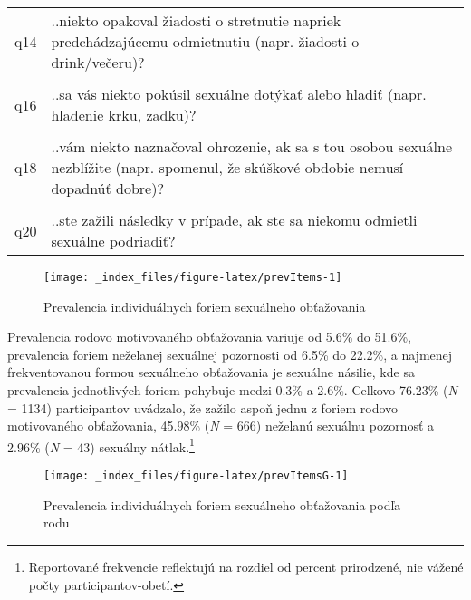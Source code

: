 \documentclass[
]{article}
\begin{document}
\begin{table}[H]
{\begin{tabular}[t]{ll}
q14 & ..niekto opakoval žiadosti o stretnutie napriek predchádzajúcemu odmietnutiu (napr. žiadosti o drink/večeru)?\\
\cellcolor{gray!6}{q15} & \cellcolor{gray!6}{..sa vás niekto dotýkal spôsobom, ktorý vo vás vyvolával nepríjemné pocity (napr. dal vám ruku cez plece, potľapkal vás po ramene, zadku)?}\\
\addlinespace
q16 & ..sa vás niekto pokúsil sexuálne dotýkať alebo hladiť (napr. hladenie krku, zadku)?\\
\cellcolor{gray!6}{q17} & \cellcolor{gray!6}{..vám niekto naznačoval výhody za sexuálne zblíženie?}\\
q18 & ..vám niekto naznačoval ohrozenie, ak sa s tou osobou sexuálne nezblížite (napr. spomenul, že skúškové obdobie nemusí dopadnúť dobre)?\\
\cellcolor{gray!6}{q19} & \cellcolor{gray!6}{..niekto vyvolával dojem, že sa mu/jej musíte sexuálne podriadiť, ak chcete, aby sa s vami dobre zaobchádzalo (napr. vyžadoval sexuálne zblíženie za úspešné absolvovanie skúšky)?}\\
q20 & ..ste zažili následky v prípade, ak ste sa niekomu odmietli sexuálne podriadiť?\\
\bottomrule
\end{tabular}}
\end{table}

\begin{figure}

{\centering \texttt{[image: \_index\_files/figure-latex/prevItems-1]} 

}

\caption{Prevalencia individuálnych foriem sexuálneho obťažovania}\label{fig:prevItems}
\end{figure}

Prevalencia rodovo motivovaného obťažovania variuje od 5.6\% do 51.6\%, prevalencia foriem neželanej sexuálnej pozornosti od 6.5\% do 22.2\%, a najmenej frekventovanou formou sexuálneho obťažovania je sexuálne násilie, kde sa prevalencia jednotlivých foriem pohybuje medzi 0.3\% a 2.6\%. Celkovo 76.23\% (\emph{N} = 1134) participantov uvádzalo, že zažilo aspoň jednu z foriem rodovo motivovaného obťažovania, 45.98\% (\emph{N} = 666) neželanú sexuálnu pozornosť a 2.96\% (\emph{N} = 43) sexuálny nátlak.\footnote{Reportované frekvencie reflektujú na rozdiel od percent prirodzené, nie vážené počty participantov-obetí.}

\begin{figure}

{\centering \texttt{[image: \_index\_files/figure-latex/prevItemsG-1]} 

}

\caption{Prevalencia individuálnych foriem sexuálneho obťažovania podľa rodu}\label{fig:prevItemsG}
\end{figure}
\end{document}
